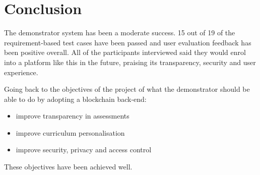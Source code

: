 \section{Conclusion}

The demonstrator system has been a moderate success. 15 out of 19 of the requirement-based test cases have been passed and
user evaluation feedback has been positive overall.
All of the participants interviewed said they would enrol into a platform like this in the future,
praising its transparency, security and user experience.

Going back to the objectives of the project of what the demonstrator should be able to do by adopting a blockchain back-end:

\begin{itemize}
	\item improve transparency in assessments
	\item improve curriculum personalisation
	\item improve security, privacy and access control
\end{itemize}

These objectives have been achieved well.

